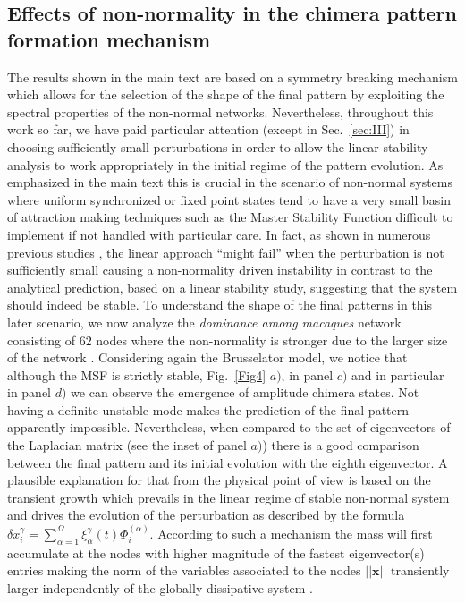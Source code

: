\documentclass[prx,twocolumn,amsmath,noshowkeys,noshowpacs,amssymb]{revtex4-2}
\begin{document}
\subsection{Effects of non-normality in the chimera pattern formation mechanism}
\label{sec:AppC}
\noindent

The results shown {in the main text} are based on a symmetry breaking mechanism which allows for the selection of the shape of the final pattern by exploiting the spectral properties of the non-normal networks. Nevertheless, throughout this work so far, we have paid particular attention (except in Sec.~\ref{sec:III}) in choosing sufficiently small perturbations in order to allow the linear stability analysis to work appropriately in the initial regime of the pattern evolution. As emphasized in the main text this is crucial in the scenario of non-normal systems where uniform synchronized or fixed point states tend to have a very small basin of attraction making techniques such as the Master Stability Function difficult to implement if not handled with particular care. In fact, as shown in numerous previous studies \cite{Asllani2018PRE, Muolo2019, Muolo2021}, the linear approach ``might fail'' when the perturbation is not sufficiently small causing a non-normality driven instability in contrast to the analytical prediction, based on a linear stability study, suggesting that the system should indeed be stable. To understand the shape of the final patterns in this later scenario, we now analyze the \emph{dominance among macaques} network consisting of $62$ nodes where the non-normality is stronger due to the larger size of the network \cite{asllani2018structure}. Considering again the Brusselator model, we notice that although the MSF is strictly stable, Fig.~\ref{Fig4} $a)$, in panel $c)$ and in particular in panel $d)$ we can observe the emergence of amplitude chimera states. Not having a definite unstable mode makes the prediction of the final pattern apparently impossible. Nevertheless, when compared to the set of eigenvectors of the Laplacian matrix (see the inset of panel $a)$) there is a good comparison between the final pattern and its initial evolution with the eighth eigenvector. A plausible explanation for that from the physical point of view is based on the transient growth which prevails in the linear regime of stable non-normal system and drives the evolution of the perturbation as described by the formula $\delta x_i^{\gamma}=\sum_{\alpha=1}^{\Omega} \xi_{\alpha}^{\gamma}(t)\Phi_i^{(\alpha)}$. According to such a mechanism the mass will first accumulate at the nodes with higher magnitude of the fastest eigenvector(s) entries making the norm of the variables associated to the nodes $||\mathbf{x}||$ transiently larger independently of the globally dissipative system \cite{Asllani2018PRE}. 
\end{document}
